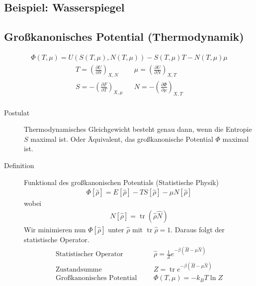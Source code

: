\documentclass[11pt]{article}
\theoremstyle{plain}
\newcommand{\pd}[2]{\frac{\partial #1 }{\partial #2}}
\newcommand{\trace}{\operatorname{tr}}
\begin{document}
\subsection*{Beispiel: Wasserspiegel}
\subsection*{Gro\ss{}kanonisches Potential (Thermodynamik)}
%
\begin{align*}
  \Phi(T, \mu) = U\left( S (T, \mu), N(T, \mu) \right) - 
  S(T, \mu) T - N(T, \mu) \mu
\end{align*}
%
%
\begin{align*}
  T = \left( \pd{U}{S} \right)_{X, N} && \mu = \left( \pd{ U}{N} \right)_{X, T} \\
  S = - \left( \pd{F}{T} \right)_{X, \mu} && N = -\left( \pd{\Phi}{\mu} \right)_{X, T} \\
\end{align*}
%
\begin{description}
  \item[Postulat] Thermodynamisches Gleichgewicht besteht genau dann, wenn
    die Entropie $S$ maximal ist. Oder \"Aquivalent, das gro\ss{}kanonische
    Potential $\Phi$ maximal ist.
  \item[Definition] Funktional des gro\ss{}kanonischen Potentials
    (Statistische Physik)
    \begin{align*}
      \Phi[\hat{\rho}] = E \left[ \hat{\rho} \right] - T S [\hat{\rho}]
      - \mu N[ \hat{\rho}]
    \end{align*}
    wobei %
    \begin{align*}
      N [\hat{\rho}] = \trace (\hat{\rho} \hat{N})
    \end{align*}
    Wir minimieren nun $\Phi[\hat{\rho}]$ unter $\hat{\rho}$ mit
    $ \trace \hat{\rho} = 1$. Daraus folgt der statistische Operator.
    \begin{align*}
      \text{Statistischer Operator} && & \hat{\rho} = \frac{1}{Z} 
      e^{- \beta (\hat{H} - \mu \hat{N})} \\
      \text{Zustandsumme } && & Z = \trace e^{-\beta (\hat{H} - \mu \hat{N})}  \\
      \text{Gro\ss{}kanonisches Potential}  && &
      \Phi (T, \mu) = -k_B T \ln{Z} 
    \end{align*}
\end{description}
\end{document}
